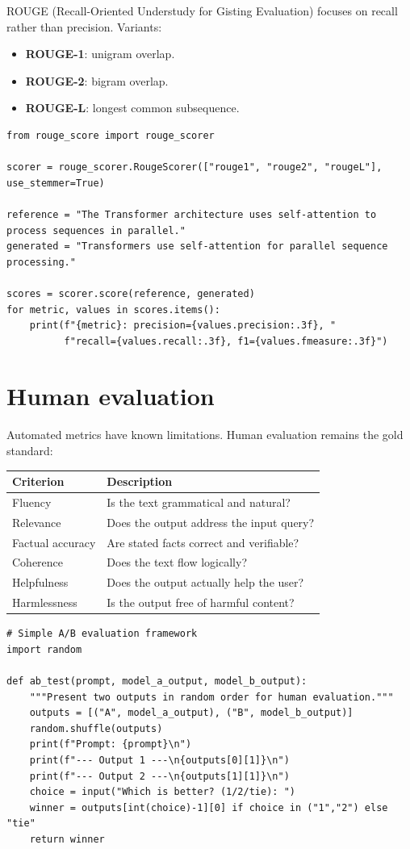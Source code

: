 ROUGE (Recall-Oriented Understudy for Gisting Evaluation) focuses on recall rather than precision. Variants:
\begin{itemize}
  \item \textbf{ROUGE-1}: unigram overlap.
  \item \textbf{ROUGE-2}: bigram overlap.
  \item \textbf{ROUGE-L}: longest common subsequence.
\end{itemize}

\begin{verbatim}
from rouge_score import rouge_scorer

scorer = rouge_scorer.RougeScorer(["rouge1", "rouge2", "rougeL"], use_stemmer=True)

reference = "The Transformer architecture uses self-attention to process sequences in parallel."
generated = "Transformers use self-attention for parallel sequence processing."

scores = scorer.score(reference, generated)
for metric, values in scores.items():
    print(f"{metric}: precision={values.precision:.3f}, "
          f"recall={values.recall:.3f}, f1={values.fmeasure:.3f}")
\end{verbatim}

\section{Human evaluation}

Automated metrics have known limitations. Human evaluation remains the gold standard:

\begin{longtable}{p{3cm}p{9.5cm}}
\toprule
\textbf{Criterion} & \textbf{Description} \\
\midrule
Fluency & Is the text grammatical and natural? \\
Relevance & Does the output address the input query? \\
Factual accuracy & Are stated facts correct and verifiable? \\
Coherence & Does the text flow logically? \\
Helpfulness & Does the output actually help the user? \\
Harmlessness & Is the output free of harmful content? \\
\bottomrule
\end{longtable}

\begin{verbatim}
# Simple A/B evaluation framework
import random

def ab_test(prompt, model_a_output, model_b_output):
    """Present two outputs in random order for human evaluation."""
    outputs = [("A", model_a_output), ("B", model_b_output)]
    random.shuffle(outputs)
    print(f"Prompt: {prompt}\n")
    print(f"--- Output 1 ---\n{outputs[0][1]}\n")
    print(f"--- Output 2 ---\n{outputs[1][1]}\n")
    choice = input("Which is better? (1/2/tie): ")
    winner = outputs[int(choice)-1][0] if choice in ("1","2") else "tie"
    return winner
\end{verbatim}

